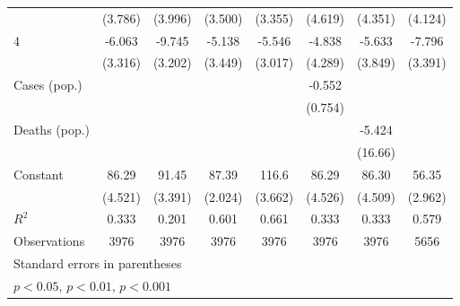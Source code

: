 \documentclass{article}
\begin{document}
{\begin{longtable}{l*{7}{c}}
                &  (3.786)         &  (3.996)         &  (3.500)         &  (3.355)         &  (4.619)         &  (4.351)         &  (4.124)         \\
4               &   -6.063         &   -9.745\sym{**} &   -5.138         &   -5.546         &   -4.838         &   -5.633         &   -7.796\sym{*}  \\
                &  (3.316)         &  (3.202)         &  (3.449)         &  (3.017)         &  (4.289)         &  (3.849)         &  (3.391)         \\
Cases (pop.)    &                  &                  &                  &                  &   -0.552         &                  &                  \\
                &                  &                  &                  &                  &  (0.754)         &                  &                  \\
Deaths (pop.)   &                  &                  &                  &                  &                  &   -5.424         &                  \\
                &                  &                  &                  &                  &                  &  (16.66)         &                  \\
Constant        &    86.29\sym{***}&    91.45\sym{***}&    87.39\sym{***}&    116.6\sym{***}&    86.29\sym{***}&    86.30\sym{***}&    56.35\sym{***}\\
                &  (4.521)         &  (3.391)         &  (2.024)         &  (3.662)         &  (4.526)         &  (4.509)         &  (2.962)         \\
\hline
\(R^{2}\)       &    0.333         &    0.201         &    0.601         &    0.661         &    0.333         &    0.333         &    0.579         \\
Observations    &     3976         &     3976         &     3976         &     3976         &     3976         &     3976         &     5656         \\
\hline\hline
\multicolumn{8}{l}{\footnotesize Standard errors in parentheses}\\
\multicolumn{8}{l}{\footnotesize \sym{*} \(p<0.05\), \sym{**} \(p<0.01\), \sym{***} \(p<0.001\)}\\
\end{longtable}
}
\end{document}
